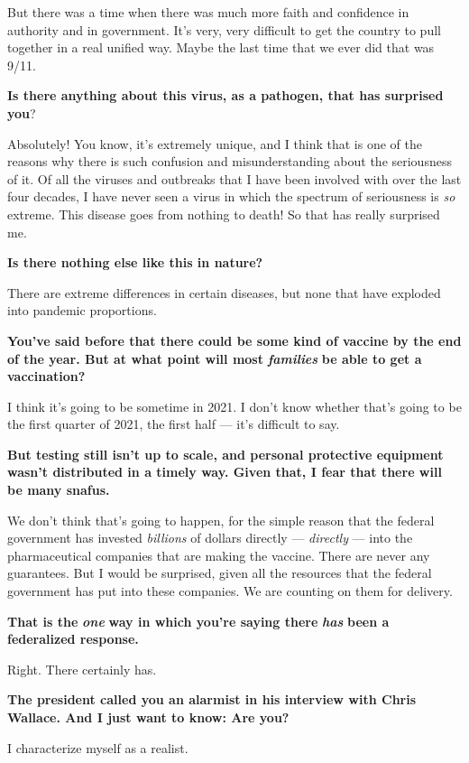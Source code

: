 But there was a time when there was much more faith and confidence in
authority and in government. It's very, very difficult to get the
country to pull together in a real unified way. Maybe the last time that
we ever did that was 9/11.

\textbf{Is there anything about this virus, as a pathogen, that has
surprised you}?

Absolutely! You know, it's extremely unique, and I think that is one of
the reasons why there is such confusion and misunderstanding about the
seriousness of it. Of all the viruses and outbreaks that I have been
involved with over the last four decades, I have never seen a virus in
which the spectrum of seriousness is \emph{so} extreme. This disease
goes from nothing to death! So that has really surprised me.

\textbf{Is there nothing else like this in nature?}

There are extreme differences in certain diseases, but none that have
exploded into pandemic proportions.

\textbf{You've said before that there could be some kind of vaccine by
the end of the year. But at what point will most}
\emph{\textbf{families}} \textbf{be able to get a vaccination?}

I think it's going to be sometime in 2021. I don't know whether that's
going to be the first quarter of 2021, the first half --- it's difficult
to say.

\textbf{But testing still isn't up to scale, and personal protective
equipment wasn't distributed in a timely way. Given that, I fear that
there will be many snafus.}

We don't think that's going to happen, for the simple reason that the
federal government has invested \emph{billions} of dollars directly ---
\emph{directly} --- into the pharmaceutical companies that are making
the vaccine. There are never any guarantees. But I would be surprised,
given all the resources that the federal government has put into these
companies. We are counting on them for delivery.

\textbf{That is the} \emph{\textbf{one}} \textbf{way in which you're
saying there} \emph{\textbf{has}} \textbf{been a federalized response.}

Right. There certainly has.

\textbf{The president called you an alarmist in his interview with Chris
Wallace. And I just want to know: Are you?}

I characterize myself as a realist.

